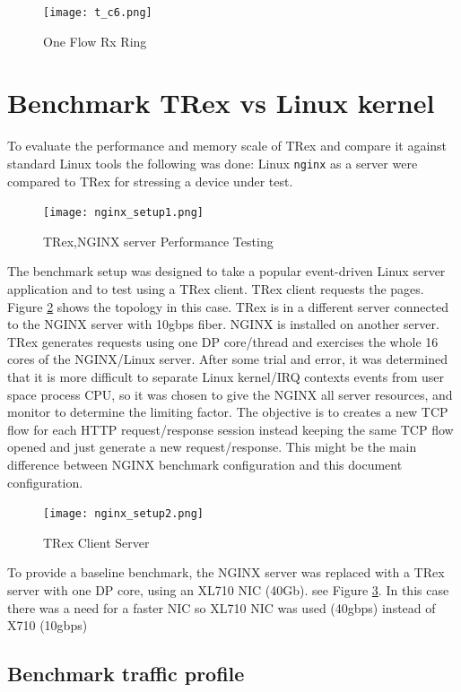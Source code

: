 \documentclass[letterpaper]{article}
\begin{document}
\begin{figure}[h]
\texttt{[image: t\_c6.png]}
\caption{One Flow Rx Ring}
\label{fig:rx_ring}
\end{figure}


\section{Benchmark  TRex vs Linux kernel}

To evaluate the performance and memory scale of TRex and compare it against standard Linux tools the following was done: 
Linux \texttt{nginx} as a server were compared to TRex for stressing a device under test.

\begin{figure}[h]
\texttt{[image: nginx\_setup1.png]}
\caption{TRex,NGINX server Performance Testing}
\label{fig:trex_nginx}
\end{figure}

The benchmark setup was designed to take a popular event-driven Linux server application and to test using a TRex client. 
TRex client requests the pages. Figure \ref{fig:trex_nginx} shows the topology in this case. TRex is in a different server connected to the NGINX server with 10gbps fiber. 
NGINX is installed on another server. TRex generates requests using one DP core/thread and exercises the whole 16 cores of the NGINX/Linux server. 
After some trial and error, it was determined that it is more difficult to separate Linux kernel/IRQ contexts events from user space process CPU, 
so it was chosen to give the NGINX all server resources, and monitor to determine the limiting factor.
The objective is to creates a new TCP flow for each HTTP request/response session instead keeping the same TCP flow opened and just generate a new request/response. 
This might be the main difference between NGINX benchmark configuration and this document configuration. 

\begin{figure}[h]
\texttt{[image: nginx\_setup2.png]}
\caption{TRex Client Server}
\label{fig:trex_vs_trex}
\end{figure}

To provide a baseline benchmark, the NGINX server was replaced with a TRex server with one DP core, using an XL710 NIC (40Gb). 
see Figure \ref{fig:trex_vs_trex}. In this case there was a need for a faster NIC so XL710 NIC was used (40gbps) instead of X710 (10gbps)

\subsection{Benchmark traffic profile}
\end{document}
